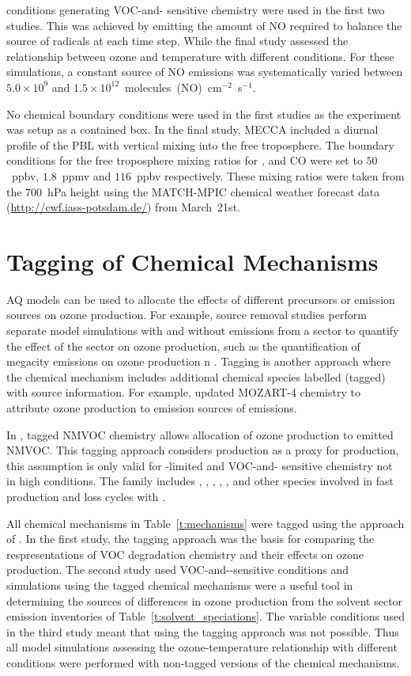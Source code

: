  conditions generating VOC-and- sensitive chemistry were used in the first two studies.
This was achieved by emitting the amount of NO required to balance the source of radicals at each time step.
While the final study assessed the relationship between ozone and temperature with different  conditions.
For these simulations, a constant source of NO emissions was systematically varied between $5.0 \times 10^9$ and $1.5 \times 10^{12}$~molecules~(NO)~cm$^{-2}$~s$^{-1}$.

No chemical boundary conditions were used in the first studies as the experiment was setup as a contained box.
In the final study, MECCA included a diurnal profile of the PBL with vertical mixing into the free troposphere.
The boundary conditions for the free troposphere mixing ratios for ,  and CO were set to $50$~ppbv, $1.8$~ppmv and $116$~ppbv respectively. 
These mixing ratios were taken from the $700$~hPa height using the MATCH-MPIC chemical weather forecast data (\url{http://cwf.iass-potsdam.de/}) from March~21st.

\section{Tagging of Chemical Mechanisms} \label{s:tagging}
AQ models can be used to allocate the effects of different precursors or emission sources on ozone production.
For example, source removal studies perform separate model simulations with and without emissions from a sector to quantify the effect of the sector on ozone production, such as the quantification of megacity emissions on ozone production n \citet{Butler:2009}.
Tagging is another approach where the chemical mechanism includes additional chemical species labelled (tagged) with source information.
For example, \citet{Emmons:2012} updated MOZART-4 chemistry to attribute ozone production to emission sources of  emissions.

In \citet{Butler:2011}, tagged NMVOC chemistry allows allocation of ozone production to emitted NMVOC.
This tagging approach considers  production as a proxy for  production, this assumption is only valid for -limited and VOC-and- sensitive chemistry not in high  conditions.
The  family includes , , , , ,  and other species involved in fast production and loss cycles with .

All chemical mechanisms in Table~\ref{t:mechanisms} were tagged using the approach of \citet{Butler:2011}.
In the first study, the tagging approach was the basis for comparing the respresentations of VOC degradation chemistry and their effects on ozone production.
The second study used VOC-and--sensitive conditions and simulations using the tagged chemical mechanisms were a useful tool in determining the sources of differences in ozone production from the solvent sector emission inventories of Table~\ref{t:solvent_speciations}.
The variable  conditions used in the third study meant that using the tagging approach was not possible.
Thus all model simulations assessing the ozone-temperature relationship with different  conditions were performed with non-tagged versions of the chemical mechanisms.
